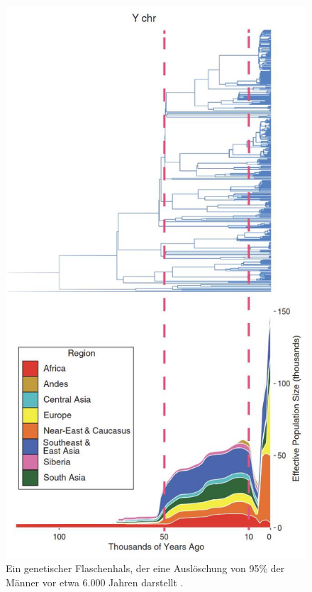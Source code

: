 \documentclass[10pt,twocolumn,letterpaper]{article}
\begin{document}
\begin{figure}[b]
\begin{center}
   \includegraphics[width=1\linewidth]{bottleneck.jpg}
\end{center}
   \caption{Ein genetischer Flaschenhals, der eine Auslöschung von 95\% der Männer vor etwa 6.000 Jahren darstellt \cite{62}.}
\label{fig:10}
\label{fig:onecol}

\end{figure}
\end{document}
